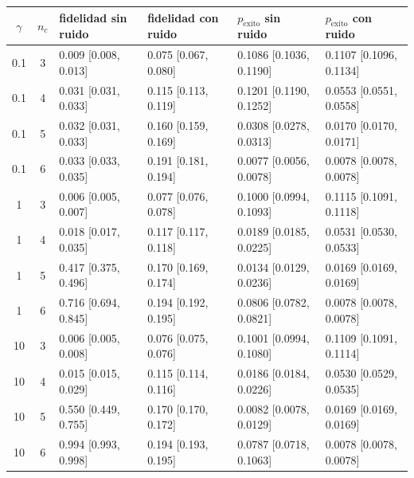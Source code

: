 \begin{tabular}{ccllll}
\hline
$\gamma$ & $n_c$ & fidelidad sin ruido & fidelidad con ruido & $p_{\mathrm{\acute{e}xito}}$ sin ruido & $p_{\mathrm{\acute{e}xito}}$ con ruido \\
\hline
0.1 & 3 & 0.009 [0.008, 0.013] & 0.075 [0.067, 0.080] & 0.1086 [0.1036, 0.1190] & 0.1107 [0.1096, 0.1134] \\
0.1 & 4 & 0.031 [0.031, 0.033] & 0.115 [0.113, 0.119] & 0.1201 [0.1190, 0.1252] & 0.0553 [0.0551, 0.0558] \\
0.1 & 5 & 0.032 [0.031, 0.033] & 0.160 [0.159, 0.169] & 0.0308 [0.0278, 0.0313] & 0.0170 [0.0170, 0.0171] \\
0.1 & 6 & 0.033 [0.033, 0.035] & 0.191 [0.181, 0.194] & 0.0077 [0.0056, 0.0078] & 0.0078 [0.0078, 0.0078] \\
1 & 3 & 0.006 [0.005, 0.007] & 0.077 [0.076, 0.078] & 0.1000 [0.0994, 0.1093] & 0.1115 [0.1091, 0.1118] \\
1 & 4 & 0.018 [0.017, 0.035] & 0.117 [0.117, 0.118] & 0.0189 [0.0185, 0.0225] & 0.0531 [0.0530, 0.0533] \\
1 & 5 & 0.417 [0.375, 0.496] & 0.170 [0.169, 0.174] & 0.0134 [0.0129, 0.0236] & 0.0169 [0.0169, 0.0169] \\
1 & 6 & 0.716 [0.694, 0.845] & 0.194 [0.192, 0.195] & 0.0806 [0.0782, 0.0821] & 0.0078 [0.0078, 0.0078] \\
10 & 3 & 0.006 [0.005, 0.008] & 0.076 [0.075, 0.076] & 0.1001 [0.0994, 0.1080] & 0.1109 [0.1091, 0.1114] \\
10 & 4 & 0.015 [0.015, 0.029] & 0.115 [0.114, 0.116] & 0.0186 [0.0184, 0.0226] & 0.0530 [0.0529, 0.0535] \\
10 & 5 & 0.550 [0.449, 0.755] & 0.170 [0.170, 0.172] & 0.0082 [0.0078, 0.0129] & 0.0169 [0.0169, 0.0169] \\
10 & 6 & 0.994 [0.993, 0.998] & 0.194 [0.193, 0.195] & 0.0787 [0.0718, 0.1063] & 0.0078 [0.0078, 0.0078] \\
\hline
\end{tabular}
